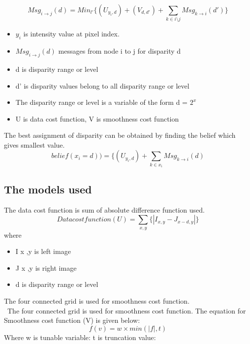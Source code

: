\documentclass{singlecol-new}
\theoremstyle{TH}{
\newtheorem{lemma}{Lemma}
\newtheorem{theorem}[lemma]{Theorem}
\newtheorem{corrolary}[lemma]{Corrolary}
\newtheorem{conjecture}[lemma]{Conjecture}
\newtheorem{proposition}[lemma]{Proposition}
\newtheorem{claim}[lemma]{Claim}
\newtheorem{stheorem}[lemma]{Wrong Theorem}
\newtheorem{algorithm}{Algorithm}
}
\theoremstyle{THrm}{
\newtheorem{definition}{Definition}[section]
\newtheorem{question}{Question}[section]
\newtheorem{remark}{Remark}
\newtheorem{scheme}{Scheme}
}
\theoremstyle{THhit}{
\newtheorem{case}{Case}[section]
}
\begin{document}
\begin{equation}\label{}
Msg_{i\rightarrow j}(d) = Min_{l'}\{(U_{y_{i},d})+ (V _{d,d'}) +\sum_{k\in i\setminus j} Msg_{k\rightarrow i}(d')\}
\end{equation}
\begin{itemize}
\item{$y_{i}$ is intensity value at pixel index.}\item{$ Msg_{i\rightarrow j}(d)$   messages from node i to j for disparity d } \item{ d is disparity range or level} \item { d' is disparity values belong to all disparity range or level } \item{   The disparity range or level is a variable of the form d = $2^{x}$ } \item{  U is data cost function, V is smoothness cost function }
\end{itemize}
The best assignment of disparity can be obtained by finding the belief which gives smallest value.
\begin{equation}\label{}
  belief({x}_{i}=d)) = \{(U_{y_{i},d}) + \sum_{k\in x_{i}} Msg_{k\rightarrow i}(d)
\end{equation}
\subsection{The models used }
The data cost function is sum of absolute difference function used.
\begin{equation}\label{}
    Data cost function (U) = \sum_{x,y} \{ | I_{x,y}- J_{x-d,y} |\}
\end{equation}
where
\begin{itemize}
\item{ I x ,y  is left image }
\item{ J x ,y  is right image } \item{ d is disparity range or level  }
\end{itemize}
The four connected grid is used for smoothness cost function.\\\     The four connected grid is used for smoothness cost function.
The equation for  Smoothness cost function (V) is given below:
\begin{equation}\label{}
f(v) = w \times min(|f |, t)
\end{equation}
Where w is tunable variable: t is truncation value:
\end{document}
